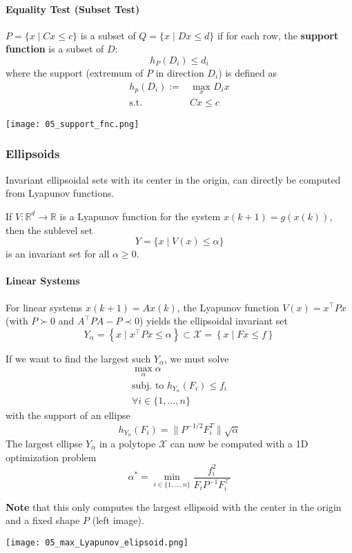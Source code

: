 \paragraph{Equality Test (Subset Test)}
$P=\{x\mid Cx\leq c\}$ is a subset of $Q=\{x\mid Dx\leq d\}$ if for each row, the \textbf{support function} is a subset of $D$:
\begin{equation*}
    h_P(D_i) \leq d_i
\end{equation*}
where the support (extremum of $P$ in direction $D_i$) is defined as
\begin{align*}
    h_p(D_i) :=     & \max_x D_i x \\
    \mathrm{s.t.}\; & Cx\leq c
\end{align*}
\begin{center}
    \texttt{[image: 05\_support\_fnc.png]}
\end{center}
\subsubsection{Ellipsoids}
Invariant ellipsoidal sets with its center in the origin, can directly be computed from Lyapunov functions.

\newpar{}
If $V:\mathbb{R}^d\to\mathbb{R}$ is a Lyapunov function for the system $x(k+1)=g(x(k))$, then the sublevel set
\begin{equation*}
    Y = \{x\mid V(x)\leq \alpha\}
\end{equation*}
is an invariant set for all $\alpha \geq 0$.

\paragraph{Linear Systems}
For linear systems $x(k+1)=Ax(k)$, the Lyapunov function $V(x)=x^\top Px$ (with $P\succ 0$  and $A^\top PA-P \prec 0$) yields the ellipsoidal invariant set
\begin{equation*}
    Y_\alpha = \left\{x\mid x^\top Px\leq \alpha\right\} \subset \mathcal{X}= \left\{x\mid Fx\leq f\right\}
\end{equation*}

\newpar{}

If we want to find the largest such $Y_\alpha$, we must solve
\begin{gather*}
    \max_{\alpha}\alpha \\
    \text{subj. to }h_{Y_{\alpha}}(F_{i})\leq f_{i} \\
    \forall i\in\{1,...,n\}
\end{gather*}
with the support of an ellipse
\begin{equation*}
    h_{Y_\alpha}(F_i)=\|P^{-1/2}F_i^T\|\sqrt{\alpha}
\end{equation*}
The largest ellipse $Y_\alpha$ in a polytope $\mathcal{X}$ can now be computed with a 1D optimization problem
\begin{equation*}
    \alpha^* = \min_{i\in \{1,\ldots, n\}} \frac{f_i^2}{F_i P^{-1} F_i^\top}
\end{equation*}

\textbf{Note} that this only computes the largest ellipsoid with the center in the origin and a fixed shape $P$ (left image).
\begin{center}
    \texttt{[image: 05\_max\_Lyapunov\_elipsoid.png]}
\end{center}

